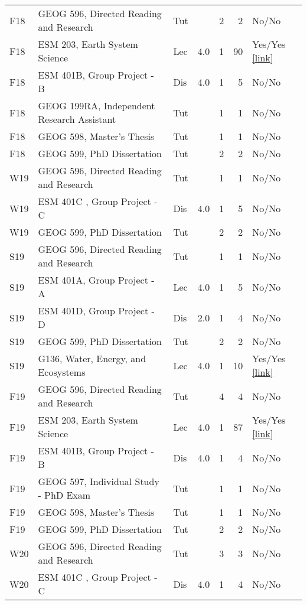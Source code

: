 \begin{longtable}{p{1cm}p{7cm}p{0.75cm}rrrp{2.5cm}}
F18 & GEOG 596, Directed Reading and Research & Tut &  & 2 & 2 & No/No    \\ 
F18 & ESM 203, Earth System Science & Lec & 4.0 & 1 & 90 & Yes/Yes  \href{https://ucsb.box.com/s/vvhpxerul6hbzum3fvmwigzd3y8yset6}{[link]}  \\ 
F18 & ESM 401B, Group Project - B & Dis & 4.0 & 1 & 5 & No/No    \\ 
F18 & GEOG 199RA, Independent Research Assistant & Tut &  & 1 & 1 & No/No    \\ 
F18 & GEOG 598, Master’s Thesis & Tut &  & 1 & 1 & No/No    \\ 
F18 & GEOG 599, PhD Dissertation & Tut &  & 2 & 2 & No/No    \\ 
W19 & GEOG 596, Directed Reading and Research & Tut &  & 1 & 1 & No/No    \\ 
W19 & ESM 401C , Group Project - C & Dis & 4.0 & 1 & 5 & No/No    \\ 
W19 & GEOG 599, PhD Dissertation & Tut &  & 2 & 2 & No/No    \\ 
S19 & GEOG 596, Directed Reading and Research & Tut &  & 1 & 1 & No/No    \\ 
S19 & ESM 401A, Group Project - A & Lec & 4.0 & 1 & 5 & No/No    \\ 
S19 & ESM 401D, Group Project - D & Dis & 2.0 & 1 & 4 & No/No    \\ 
S19 & GEOG 599, PhD Dissertation & Tut &  & 2 & 2 & No/No    \\ 
S19 & G136, Water, Energy, and Ecosystems & Lec & 4.0 & 1 & 10 & Yes/Yes  \href{https://ucsb.box.com/s/9oj1uqebr0a3gcg9brhfxw6ys8atw9oi}{[link]}  \\ 
F19 & GEOG 596, Directed Reading and Research & Tut &  & 4 & 4 & No/No    \\ 
F19 & ESM 203, Earth System Science & Lec & 4.0 & 1 & 87 & Yes/Yes  \href{https://ucsb.box.com/s/btln348spk7zsculb0swyrqe6nt0so33}{[link]}  \\ 
F19 & ESM 401B, Group Project - B & Dis & 4.0 & 1 & 4 & No/No    \\ 
F19 & GEOG 597, Individual Study - PhD Exam & Tut &  & 1 & 1 & No/No    \\ 
F19 & GEOG 598, Master’s Thesis & Tut &  & 1 & 1 & No/No    \\ 
F19 & GEOG 599, PhD Dissertation & Tut &  & 2 & 2 & No/No    \\ 
W20 & GEOG 596, Directed Reading and Research & Tut &  & 3 & 3 & No/No    \\ 
W20 & ESM 401C , Group Project - C & Dis & 4.0 & 1 & 4 & No/No    \\ 

\end{longtable}
